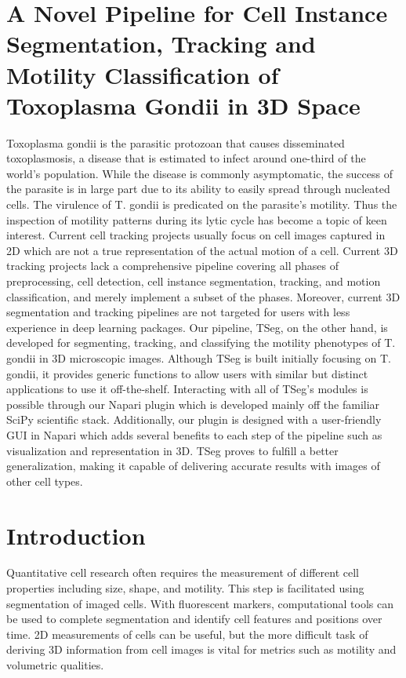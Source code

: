\documentclass[./dissertation.tex]{subfiles}
\begin{document}
\chapter{A Novel Pipeline for Cell Instance Segmentation, Tracking and Motility Classification of Toxoplasma Gondii in 3D Space}

Toxoplasma gondii is the parasitic protozoan that causes disseminated toxoplasmosis, a disease that is estimated to infect around one-third of the world's population. While the disease is commonly asymptomatic, the success of the parasite is in large part due to its ability to easily spread through nucleated cells. The virulence of T. gondii is predicated on the parasite's motility. Thus the inspection of motility patterns during its lytic cycle has become a topic of keen interest. Current cell tracking projects usually focus on cell images captured in 2D which are not a true representation of the actual motion of a cell. Current 3D tracking projects lack a comprehensive pipeline covering all phases of preprocessing, cell detection, cell instance segmentation, tracking, and motion classification, and merely implement a subset of the phases. Moreover, current 3D segmentation and tracking pipelines are not targeted for users with less experience in deep learning packages. Our pipeline, TSeg, on the other hand, is developed for segmenting, tracking, and classifying the motility phenotypes of T. gondii in 3D microscopic images. Although TSeg is built initially focusing on T. gondii, it provides generic functions to allow users with similar but distinct applications to use it off-the-shelf. Interacting with all of TSeg's modules is possible through our Napari plugin which is developed mainly off the familiar SciPy scientific stack. Additionally, our plugin is designed with a user-friendly GUI in Napari which adds several benefits to each step of the pipeline such as visualization and representation in 3D. TSeg proves to fulfill a better generalization, making it capable of delivering accurate results with images of other cell types.

\chapter{Introduction}
Quantitative cell research often requires the measurement of different cell properties including size, shape, and motility. This step is facilitated using segmentation of imaged cells. With fluorescent markers, computational tools can be used to complete segmentation and identify cell features and positions over time. 2D measurements of cells can be useful, but the more difficult task of deriving 3D information from cell images is vital for metrics such as motility and volumetric qualities.
\end{document}
